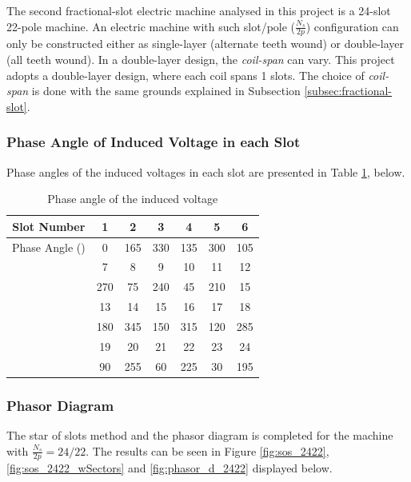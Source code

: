 \documentclass[a4paper, 11pt]{article}
\begin{document}
The second fractional-slot electric machine analysed in this project is a 24-slot 22-pole machine. An electric machine with such slot/pole ($\frac{N_s}{2p}$) configuration can only be constructed either as single-layer (alternate teeth wound) or double-layer (all teeth wound). In a double-layer design, the \textit{coil-span} can vary. This project adopts a double-layer design, where each coil spans 1 slots. The choice of \textit{coil-span} is done with the same grounds explained in Subsection \ref{subsec:fractional-slot}.

\subsubsection{Phase Angle of Induced Voltage in each Slot}

Phase angles of the induced voltages in each slot are presented in Table \ref{tab:ph_ang_2422}, below.

\begin{table}[ht!]
\centering
	\begin{tabular}{|c| c c c c c c|} 
		\hline\hline
		Slot Number & 1 & 2 & 3 & 4 & 5 & 6\\ [0.5ex] 
		\hline
		Phase Angle (\degree) & 0 & 165 & 330 &135 & 300 & 105\\ 
		\hline\hline
		 & 7 & 8 & 9 & 10 & 11 & 12\\
		\hline
		 & 270 & 75 & 240 & 45 & 210 & 15\\
		\hline\hline
		 & 13 & 14 & 15 & 16 & 17 & 18\\
		 \hline
		  & 180 & 345 & 150 & 315 & 120 & 285\\
		  \hline\hline
		  & 19 & 20 & 21 & 22 & 23 & 24\\
		  \hline
		  & 90 & 255 & 60 & 225 & 30 &195\\
		  \hline\hline
	\end{tabular}
	\caption{Phase angle of the induced voltage}
	\label{tab:ph_ang_2422}
\end{table}


\subsubsection{Phasor Diagram}
\label{subsubsec:phasor_d_2422}

The star of slots method and the phasor diagram is completed for the machine with $\frac{N_s}{2p}=24/22$. The results can be seen in Figure \ref{fig:sos_2422}, \ref{fig:sos_2422_wSectors} and \ref{fig:phasor_d_2422} displayed below.
\end{document}
